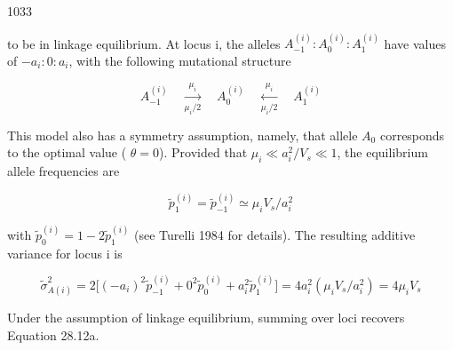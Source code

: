 \documentclass{article}
\begin{document}
1033

to be in linkage equilibrium. At locus i, the alleles  $ A_{-1}^{(i)}:A_{0}^{(i)}:A_{1}^{(i)} $ have values of  $ -a_{i}:0:a_{i} $, with the following mutational structure

\begin{equation}
A_{-1}^{(i)}\quad\xrightarrow[\mu_{i}/2]{\mu_{i}}\quad A_{0}^{(i)}\quad\xleftarrow[\mu_{i}/2]{\mu_{i}}\quad A_{1}^{(i)}
\tag{28.13a}
\label{eq:28_13a}
\end{equation}

This model also has a symmetry assumption, namely, that allele  $ A_0 $ corresponds to the optimal value ( $ \theta = 0 $). Provided that  $ \mu_i \ll a_i^2/V_s \ll 1 $, the equilibrium allele frequencies are

\begin{equation}
\widetilde{p}_{1}^{(i)}=\widetilde{p}_{-1}^{(i)}\simeq\mu_{i}V_{s}/a_{i}^{2}
\tag{28.13b}
\label{eq:28_13b}
\end{equation}

with  $ \widetilde{p}_{0}^{(i)} = 1 - 2\widetilde{p}_{1}^{(i)} $ (see Turelli 1984 for details). The resulting additive variance for locus i is

\begin{equation}
\widetilde{\sigma}_{A(i)}^{2}=2\Biggl[\left(-a_{i}\right)^{2}\widetilde{p}_{-1}^{(i)}+0^{2}\widetilde{p}_{0}^{(i)}+a_{i}^{2}\widetilde{p}_{1}^{(i)}\Biggr]=4a_{i}^{2}\left(\mu_{i}V_{s}/a_{i}^{2}\right)=4\mu_{i}V_{s}
\tag{28.13c}
\label{eq:28_13c}
\end{equation}

Under the assumption of linkage equilibrium, summing over loci recovers Equation 28.12a.
\end{document}
